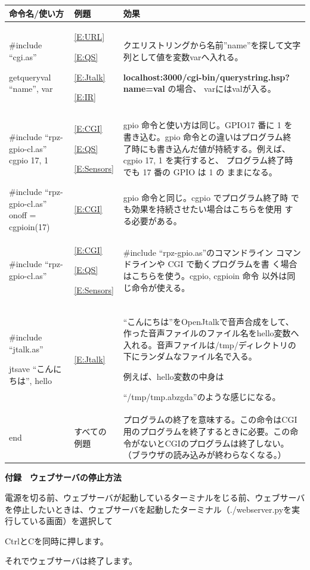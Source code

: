\documentclass[a4paper,12pt,dvipdfmx]{jarticle}
\begin{document}
\begin{flushleft}
	\tablefirsthead{}
	\tablehead{}
	\tabletail{}
	\tablelasttail{}
	\begin{supertabular}{|m{5.467cm}|m{3.181cm}|m{7.7cm}|}
		\hline
		命令名/使い方 &
		例題 &
		効果\\\hline
		\#include “cgi.as”

		getqueryval “name”, var &
		\ref*{E:URL}

		\ref*{E:QS}

		\ref*{E:Jtalk}

		\ref*{E:IR} &
		クエリストリングから名前”name”を探して文字列として値を変数varへ入れる。

		\textbf{localhost:3000/cgi-bin/querystring.hsp?name=val}
		の場合、
		varにはvalが入る。\\\hline

		\#include “rpz-gpio-cl.as”
		cgpio 17, 1&
		\ref*{E:CGI}

		\ref*{E:QS}

		\ref*{E:Sensors} &
		gpio 命令と使い方は同じ。GPIO17 番に 1 を
		書き込む。gpio 命令との違いはプログラム終
		了時にも書き込んだ値が持続する。例えば、
		cgpio 17, 1 を実行すると、
		プログラム終了時でも 17 番の GPIO は 1 の
		ままになる。\\\hline

		\#include “rpz-gpio-cl.as”
		onoff = cgpioin(17)&
		\ref*{E:CGI} &
		gpio 命令と同じ。cgpio でプログラム終了時
		でも効果を持続させたい場合はこちらを使用
		する必要がある。\\\hline

		\#include “rpz-gpio-cl.as”&
		\ref*{E:CGI}

		\ref*{E:QS}

		\ref*{E:Sensors} &
		\#include “rpz-gpio.as”のコマンドライン
		コマンドラインや CGI で動くプログラムを書
		く場合はこちらを使う。cgpio, cgpioin 命令
		以外は同じ命令が使える。\\\hline

		\#include “jtalk.as”

		jtsave “こんにちは”, hello &
		\ref*{E:Jtalk} &
		“こんにちは”をOpenJtalkで音声合成をして、作った音声ファイルのファイル名をhello変数へ入れる。音声ファイルは/tmp/ディレクトリの下にランダムなファイル名で入る。

		例えば、hello変数の中身は

		“/tmp/tmp.abzgda”のような感じになる。 \\\hline
		end &
		すべての例題 &
		プログラムの終了を意味する。この命令はCGI用のプログラムを終了するときに必要。この命令がないとCGIのプログラムは終了しない。（ブラウザの読み込みが終わらなくなる。）\\\hline
	\end{supertabular}
\end{flushleft}

\bigskip

{\bfseries
	付録　ウェブサーバの停止方法}

電源を切る前、ウェブサーバが起動しているターミナルをじる前、ウェブサーバを停止したいときは、ウェブサーバを起動したターミナル（./webserver.pyを実行している画面）を選択して


\bigskip

CtrlとCを同時に押します。


\bigskip

それでウェブサーバは終了します。


\bigskip


\bigskip


\bigskip
\end{document}
